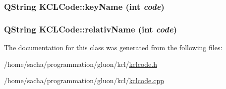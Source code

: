 \hypertarget{class_k_c_l_code_2b4ae042dbc8622b23bc025506aff9af}{
\subsubsection[{keyName}]{\setlength{\rightskip}{0pt plus 5cm}QString KCLCode::keyName (int {\em code})}}
\label{class_k_c_l_code_2b4ae042dbc8622b23bc025506aff9af}


\hypertarget{class_k_c_l_code_8d559916777d0147c8863b869392004a}{
\subsubsection[{relativName}]{\setlength{\rightskip}{0pt plus 5cm}QString KCLCode::relativName (int {\em code})}}
\label{class_k_c_l_code_8d559916777d0147c8863b869392004a}




The documentation for this class was generated from the following files:\begin{CompactItemize}
\item 
/home/sacha/programmation/gluon/kcl/\hyperlink{kclcode_8h}{kclcode.h}\item 
/home/sacha/programmation/gluon/kcl/\hyperlink{kclcode_8cpp}{kclcode.cpp}\end{CompactItemize}
